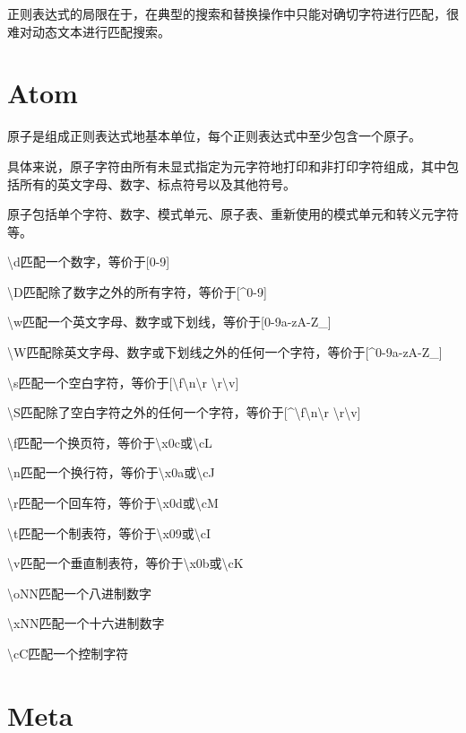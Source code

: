 正则表达式的局限在于，在典型的搜索和替换操作中只能对确切字符进行匹配，很难对动态文本进行匹配搜索。

\section{Atom}


原子是组成正则表达式地基本单位，每个正则表达式中至少包含一个原子。


具体来说，原子字符由所有未显式指定为元字符地打印和非打印字符组成，其中包括所有的英文字母、数字、标点符号以及其他符号。

原子包括单个字符、数字、模式单元、原子表、重新使用的模式单元和转义元字符等。

\begin{compactitem}
\item \textbackslash d匹配一个数字，等价于[0-9]
\item \textbackslash D匹配除了数字之外的所有字符，等价于[\^{}0-9]
\item \textbackslash w匹配一个英文字母、数字或下划线，等价于[0-9a-zA-Z\_]
\item \textbackslash W匹配除英文字母、数字或下划线之外的任何一个字符，等价于[\^{}0-9a-zA-Z\_]
\item \textbackslash s匹配一个空白字符，等价于[\textbackslash f\textbackslash n\textbackslash r \textbackslash r\textbackslash v]
\item \textbackslash S匹配除了空白字符之外的任何一个字符，等价于[\^{}\textbackslash f\textbackslash n\textbackslash r \textbackslash r\textbackslash v]
\item \textbackslash f匹配一个换页符，等价于\textbackslash x0c或\textbackslash cL
\item \textbackslash n匹配一个换行符，等价于\textbackslash x0a或\textbackslash cJ
\item \textbackslash r匹配一个回车符，等价于\textbackslash x0d或\textbackslash cM
\item \textbackslash t匹配一个制表符，等价于\textbackslash x09或\textbackslash cI
\item \textbackslash v匹配一个垂直制表符，等价于\textbackslash x0b或\textbackslash cK
\item \textbackslash oNN匹配一个八进制数字
\item \textbackslash xNN匹配一个十六进制数字
\item \textbackslash cC匹配一个控制字符
\end{compactitem}


\section{Meta}

